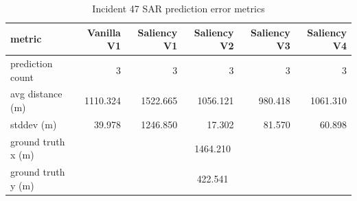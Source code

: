 \begin{table}[ht]
\centering
\caption{Incident 47 SAR prediction error metrics}
\label{tab:sar-incident-47}
\begin{tabular}{lrrrrr}
\hline
metric & Vanilla V1 & Saliency V1 & Saliency V2 & Saliency V3 & Saliency V4 \\
\hline
prediction count & 3 & 3 & 3 & 3 & 3 \\
avg distance (m) & 1110.324 & 1522.665 & 1056.121 & 980.418 & 1061.310 \\
stddev (m) & 39.978 & 1246.850 & 17.302 & 81.570 & 60.898 \\
ground truth x (m) & \multicolumn{5}{c}{1464.210} \\
ground truth y (m) & \multicolumn{5}{c}{422.541} \\
\hline
\end{tabular}
\end{table}
